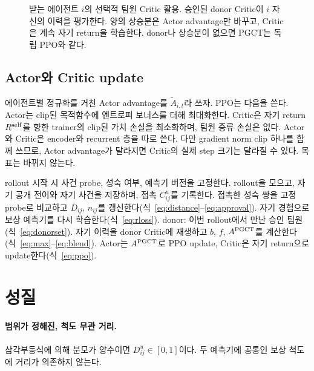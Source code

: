 \documentclass[10pt,twocolumn,letterpaper]{article}
\begin{document}
\begin{figure}[t]
\centering\resizebox{.97\textwidth}{!}{}
\caption{받는 에이전트 $i$의 선택적 팀원 Critic 활용. 승인된 donor Critic이 $i$ 자신의 이력을 평가한다. 양의 상승분은 Actor advantage만 바꾸고, Critic은 계속 자기 return을 학습한다. donor나 상승분이 없으면 PGCT는 독립 PPO와 같다.}\label{fig:critic}
\end{figure}

\subsection{Actor와 Critic update}
에이전트별 정규화를 거친 Actor advantage를 $\widetilde A_{i,t}$라 쓰자. PPO는 다음을 쓴다.
\PPOEquation
Actor는 clip된 목적함수에 엔트로피 보너스를 더해 최대화한다. Critic은 자기 return $R^{\rm self}$를 향한 trainer의 clip된 가치 손실을 최소화하며, 팀원 증류 손실은 없다. Actor와 Critic은 encoder와 recurrent 층을 따로 쓴다. 다만 gradient norm clip 하나를 함께 쓰므로, Actor advantage가 달라지면 Critic의 실제 step 크기는 달라질 수 있다. 목표는 바뀌지 않는다.

\begin{algorithm}[tb]
\caption{에이전트 $i$의 PGCT update 한 번}
\label{alg:pgct}
\begin{algorithmic}[1]
\STATE rollout 시작 시 사건 probe, 성숙 여부, 예측기 버전을 고정한다.
\STATE rollout을 모으고, 자기 공개 전이와 자기 사건을 저장하며, 접촉 $C^u_{ij}$를 기록한다.
\STATE 접촉한 성숙 쌍을 고정 probe로 비교하고 $\bar D_{ij}$, $n_{ij}$를 갱신한다(식~\ref{eq:distance}--\ref{eq:approval}).
\STATE 자기 경험으로 보상 예측기를 다시 학습한다(식~\ref{eq:rloss}).
\ENDIF
\STATE donor: 이번 rollout에서 만난 승인 팀원(식~\ref{eq:donorset}).
\STATE 자기 이력을 donor Critic에 재생하고 $b$, $f$, $A^{\rm PGCT}$를 계산한다(식~\ref{eq:max}--\ref{eq:blend}).
\STATE Actor는 $A^{\rm PGCT}$로 PPO update, Critic은 자기 return으로 update한다(식~\ref{eq:ppo}).
\end{algorithmic}
\end{algorithm}

\section{성질}
\paragraph{범위가 정해진, 척도 무관 거리.} 삼각부등식에 의해 분모가 양수이면 $D_{ij}^u\in[0,1]$이다. 두 예측기에 공통인 보상 척도에 거리가 의존하지 않는다.
\end{document}

